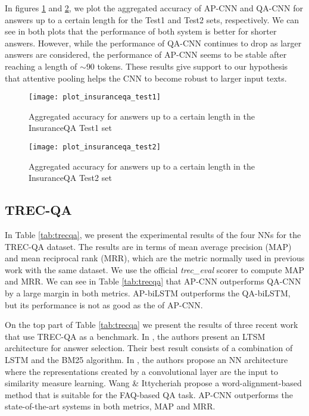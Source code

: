 \documentclass{article}
\begin{document}
In figures \ref{apcnn_vs_qacnn_t1} and \ref{apcnn_vs_qacnn_t2},
we plot the aggregated accuracy of AP-CNN and QA-CNN for answers up to a certain length for the Test1 and Test2 sets,
respectively.
We can see in both plots that the performance of both system is better for shorter answers.
However,
while the performance of QA-CNN continues to drop as larger answers are considered,
the performance of AP-CNN seems to be stable after reaching a length of $\sim$90 tokens.
These results give support to our hypothesis that attentive pooling helps the CNN to become robust to larger input texts.

\begin{figure}[ht]
\vskip 0.2in
\begin{center}
\centerline{\texttt{[image: plot\_insuranceqa\_test1]}}
\caption{Aggregated  accuracy for answers
up to a certain length in the InsuranceQA Test1 set}
\label{apcnn_vs_qacnn_t1}
\end{center}
\vskip -0.2in
\end{figure}


\begin{figure}[ht]
\vskip 0.2in
\begin{center}
\centerline{\texttt{[image: plot\_insuranceqa\_test2]}}
\caption{Aggregated accuracy for answers
up to a certain length in the InsuranceQA Test2 set}
\label{apcnn_vs_qacnn_t2}
\end{center}
\vskip -0.2in
\end{figure}


\subsection{TREC-QA}
In Table \ref{tab:trecqa},
we present the experimental results of the four NNs for the TREC-QA dataset.
The results are in terms of mean average precision (MAP) and mean reciprocal rank (MRR),
which are the metric normally used in previous work with the same dataset.
We use the official \emph{trec\_eval} scorer to compute MAP and MRR.
We can see in Table \ref{tab:trecqa} that AP-CNN outperforms QA-CNN by a large margin in both metrics.
AP-biLSTM outperforms the QA-biLSTM,
but its performance is not as good as the of AP-CNN.

On the top part of Table \ref{tab:trecqa} we present the results of three recent work that use TREC-QA as a benchmark.
In \cite{wang2015},
the authors present an LTSM architecture for answer selection. Their best result consists of a combination of LSTM and the BM25 algorithm.
In \cite{severyn2015},
the authors propose an NN architecture where the representations created by a convolutional layer are the input to similarity measure learning.
Wang \& Ittycheriah  propose a word-alignment-based method that is suitable for the FAQ-based QA task.
AP-CNN outperforms the state-of-the-art systems in both metrics,
MAP and MRR.
\end{document}

